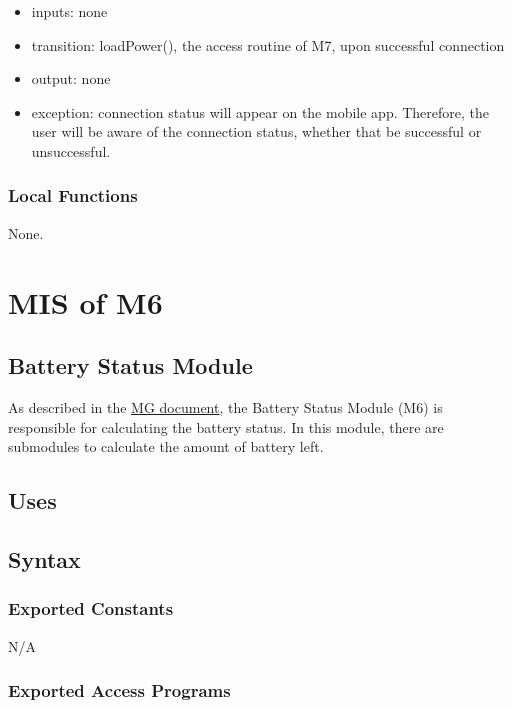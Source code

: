 \documentclass[12pt, titlepage]{article}
\begin{document}
\begin{itemize} 
\item inputs: none
\item transition: loadPower(), the access routine of M7, upon successful connection
\item output: none
\item exception: connection status will appear on the mobile app. Therefore, the user will be aware of the connection status, whether that be successful or unsuccessful. 
\end{itemize}

\subsubsection{Local Functions}

None.


\section{MIS of M6} \label{BatteryStatus} 

\subsection{Battery Status Module}

As described in the \href{https://github.com/NevoAbigail/Capstone/blob/main/docs/Design/SoftArchitecture/MG.pdf}{MG document}, the Battery Status Module (M6) is responsible for calculating the battery status. In this module, there are submodules to calculate the amount of battery left.

\subsection{Uses}


\subsection{Syntax}

\subsubsection{Exported Constants}

N/A

\subsubsection{Exported Access Programs}
\end{document}

